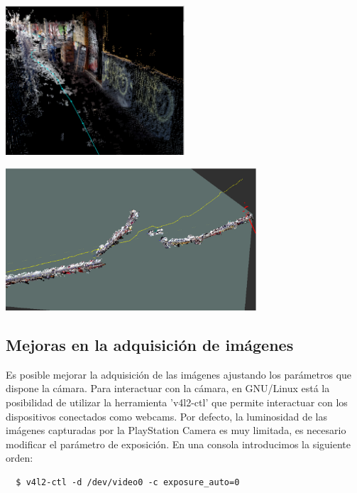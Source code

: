 \begin{minipage}{\linewidth}
    \centering
    \includegraphics[width=0.5\textwidth]{images/cap4/Exteriores-rtabmap-cerca.eps}
    \label{fig:Exteriores-Rtabmap-Cerca}
\end{minipage}

\begin{minipage}{\linewidth}
    \centering
    \includegraphics[width=0.7\textwidth]{images/cap4/Exteriores-rviz.eps}
    \label{fig:Exteriores-Rviz}
\end{minipage}


\subsection{Mejoras en la adquisición de imágenes}

Es posible mejorar la adquisición de las imágenes ajustando los parámetros que
dispone la cámara. Para interactuar con la cámara, en GNU/Linux está la
posibilidad de utilizar la herramienta 'v4l2-ctl' que permite interactuar con
los dispositivos conectados como webcams. Por defecto, la luminosidad de las
imágenes capturadas por la PlayStation Camera es muy limitada, es necesario
modificar el parámetro de exposición. En una consola introducimos la siguiente
orden:
\\
\begin{lstlisting}
  $ v4l2-ctl -d /dev/video0 -c exposure_auto=0
\end{lstlisting}

